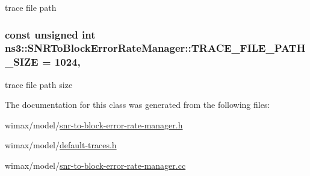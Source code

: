 trace file path 

\subsubsection[{\texorpdfstring{T\+R\+A\+C\+E\+\_\+\+F\+I\+L\+E\+\_\+\+P\+A\+T\+H\+\_\+\+S\+I\+ZE}{TRACE_FILE_PATH_SIZE}}]{\setlength{\rightskip}{0pt plus 5cm}const unsigned int ns3\+::\+S\+N\+R\+To\+Block\+Error\+Rate\+Manager\+::\+T\+R\+A\+C\+E\+\_\+\+F\+I\+L\+E\+\_\+\+P\+A\+T\+H\+\_\+\+S\+I\+ZE = 1024\hspace{0.3cm}{\ttfamily [static]}, {\ttfamily [private]}}\hypertarget{classns3_1_1SNRToBlockErrorRateManager_a41b59c050f6d25b317a8dc2ac530146c}{}\label{classns3_1_1SNRToBlockErrorRateManager_a41b59c050f6d25b317a8dc2ac530146c}


trace file path size 



The documentation for this class was generated from the following files\+:\begin{DoxyCompactItemize}
\item 
wimax/model/\hyperlink{snr-to-block-error-rate-manager_8h}{snr-\/to-\/block-\/error-\/rate-\/manager.\+h}\item 
wimax/model/\hyperlink{default-traces_8h}{default-\/traces.\+h}\item 
wimax/model/\hyperlink{snr-to-block-error-rate-manager_8cc}{snr-\/to-\/block-\/error-\/rate-\/manager.\+cc}\end{DoxyCompactItemize}
